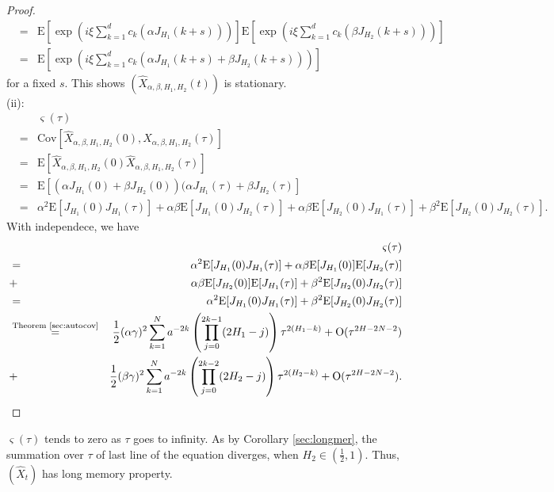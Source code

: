 \documentclass[a4paper, twoside, 11pt]{article}
\theoremstyle{definition}
\newcommand{\brkt}[1]{\left({#1} \right)}
\begin{document}
\begin{proof}
\begin{eqnarray*}
   &=& \mathrm{E}[\exp(i\xi\sum\limits_{k=1}^{d} c_k (\alpha J_{H_1}(k+s)))]\mathrm{E}[\exp(i\xi\sum\limits_{k=1}^{d} c_k (\beta J_{H_2}(k+s)))] \\
   &=& \mathrm{E}[\exp(i\xi\sum\limits_{k=1}^{d} c_k (\alpha J_{H_1}(k+s) + \beta J_{H_2}(k+s)))]
  \end{eqnarray*}
  for a fixed $s$. This shows $(\hat{X}_{\alpha,\beta,H_1,H_2}(t))$ is stationary.\\
  (ii): 
  \begin{eqnarray*}
	&&\varsigma(\tau) \\
	&=& \mathrm{Cov}[\hat{X}_{\alpha,\beta,H_1,H_2}(0), \hat{X}_{\alpha,\beta,H_1,H_2}(\tau)]\\
	&=& \mathrm{E}[\hat{X}_{\alpha,\beta,H_1,H_2}(0) \hat{X}_{\alpha,\beta,H_1,H_2}(\tau)]\\
	&=& \mathrm{E}[(\alpha J_{H_1}(0) + \beta J_{H_2}(0))(\alpha J_{H_1}(\tau) + \beta J_{H_2}(\tau)]\\
	&=& \alpha^2\mathrm{E}[J_{H_1}(0) J_{H_1}(\tau)] + \alpha\beta\mathrm{E}[J_{H_1}(0)J_{H_2}(\tau)] + \alpha\beta\mathrm{E}[J_{H_2}(0)J_{H_1}(\tau)] + \beta^2\mathrm{E}[J_{H_2}(0)J_{H_2}(\tau)].
  \end{eqnarray*}
   With independece, we have
  \begin{eqnarray*}
	&&\varsigma(\tau) \\
	&=& \alpha^2\mathrm{E}[J_{H_1}(0) J_{H_1}(\tau)] + \alpha\beta\mathrm{E}[J_{H_1}(0)]\mathrm{E}[J_{H_2}(\tau)] \\
	&+& \alpha\beta\mathrm{E}[J_{H_2}(0)]\mathrm{E}[J_{H_1}(\tau)] + \beta^2\mathrm{E}[J_{H_2}(0)J_{H_2}(\tau)]\\
	&=& \alpha^2\mathrm{E}[J_{H_1}(0) J_{H_1}(\tau)] + \beta^2\mathrm{E}[J_{H_2}(0)J_{H_2}(\tau)]\\
	&\overset{\text{Theorem \ref{sec:autocov}}}{=}& \frac{1}{2} (\alpha\gamma)^2 \sum_{k=1}^{N} a^{-2k}\brkt{\prod_{j=0}^{2k-1}(2H_1-j)}\tau^{2(H_1-k)} + \mathrm{O}(\tau^{{2H-2N-2}})\\
  &+& \frac{1}{2} (\beta\gamma)^2 \sum_{k=1}^{N} a^{-2k}\brkt{\prod_{j=0}^{2k-2}(2H_2-j)}\tau^{2(H_2-k)} + \mathrm{O}(\tau^{{2H-2N-2}}).
  \end{eqnarray*}
  \end{proof}
  $\varsigma(\tau)$ tends to zero as $\tau$ goes to infinity. As by Corollary \ref{sec:longmer},  the summation over $\tau$ of last line of the equation diverges, when $H_2 \in (\frac{1}{2}, 1)$. Thus, $(\hat{X}_t)$ has long memory property. 
\end{document}
